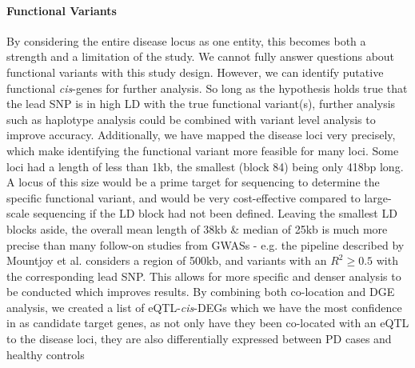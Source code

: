 \documentclass{article}
\begin{document}
\paragraph{Functional Variants}By considering the entire disease locus as one entity, this becomes both a strength and a limitation of the study. We cannot fully answer questions about functional variants with this study design. However, we can identify putative functional \textit{cis}-genes for further analysis.  So long as the hypothesis holds true that the lead SNP is in high LD with the true functional variant(s), further analysis such as haplotype analysis could be combined with variant level analysis to improve accuracy\cite{Liang2020HaplotypePhenotypes}. Additionally, we have mapped the disease loci very precisely, which make identifying the functional variant more feasible for many loci. Some loci had a length of less than 1kb, the smallest (block 84) being only 418bp long. A locus of this size would be a prime target for sequencing to determine the specific functional variant, and would be very cost-effective compared to large-scale sequencing if the LD block had not been defined. Leaving the smallest LD blocks aside, the overall mean length of 38kb \& median of 25kb is much more precise than many follow-on studies from GWASs - e.g. the pipeline described by Mountjoy et al.\cite{Mountjoy2021AnLoci} considers a region of 500kb, and variants with an $R^2\geq0.5$ with the corresponding lead SNP. This allows for more specific and denser analysis to be conducted which improves results\cite{Giambartolomei2014BayesianStatistics}. By combining both co-location and DGE analysis, we created a list of eQTL-\textit{cis}-DEGs which we have the most confidence in as candidate target genes, as not only have they been co-located with an eQTL to the disease loci, they are also differentially expressed between PD cases and healthy controls
\end{document}
